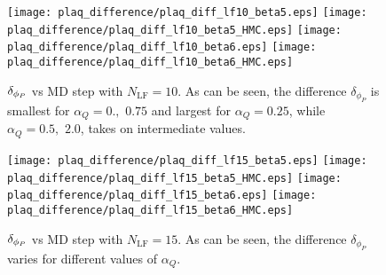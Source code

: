 \documentclass[../main.tex]{subfiles}
\begin{document}
%
\begin{figure}[htpb]\label{fig:plaq_diff_plots_lf10}
  \texttt{[image: plaq\_difference/plaq\_diff\_lf10\_beta5.eps]}
  \hfill
  \texttt{[image: plaq\_difference/plaq\_diff\_lf10\_beta5\_HMC.eps]}
  \texttt{[image: plaq\_difference/plaq\_diff\_lf10\_beta6.eps]}
  \hfill
  \texttt{[image: plaq\_difference/plaq\_diff\_lf10\_beta6\_HMC.eps]}
  \caption{${\delta_{\phi_{P}}}$ vs MD step with $N_{\mathrm{LF}} = 10$. As can be seen, the difference $\delta_{\phi_{P}}$ is
    smallest for $\alpha_Q = 0.,\,\,0.75$ and largest for $\alpha_Q = 0.25$, while $\alpha_Q = 0.5,\,\,2.0$, takes on
  intermediate values.}
\end{figure}
%
\begin{figure}[htpb]\label{fig:plaq_diff_plots_lf15}
  \texttt{[image: plaq\_difference/plaq\_diff\_lf15\_beta5.eps]}
  \hfill
  \texttt{[image: plaq\_difference/plaq\_diff\_lf15\_beta5\_HMC.eps]}
  \texttt{[image: plaq\_difference/plaq\_diff\_lf15\_beta6.eps]}
  \hfill
  \texttt{[image: plaq\_difference/plaq\_diff\_lf15\_beta6\_HMC.eps]}
  \caption{${\delta_{\phi_{P}}}$ vs MD step with $N_{\mathrm{LF}} = 15$. As can be seen, the difference $\delta_{\phi_{P}}$
    varies for different values of $\alpha_Q$.}
\end{figure}
%
% 
%
\end{document}
